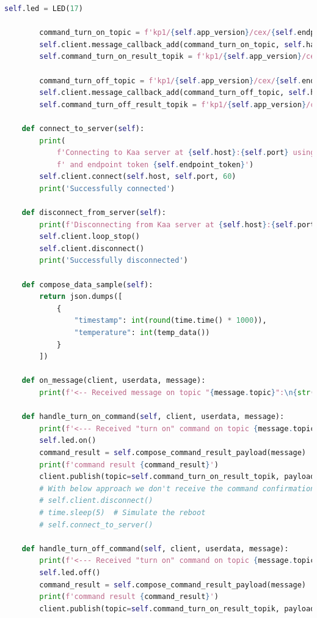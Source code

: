 {\begin{lstlisting}[language=Python]
        self.led = LED(17)

        command_turn_on_topic = f'kp1/{self.app_version}/cex/{self.endpoint_token}/command/turnon/status'
        self.client.message_callback_add(command_turn_on_topic, self.handle_turn_on_command)
        self.command_turn_on_result_topik = f'kp1/{self.app_version}/cex/{self.endpoint_token}/result/turnon'

        command_turn_off_topic = f'kp1/{self.app_version}/cex/{self.endpoint_token}/command/turnoff/status'
        self.client.message_callback_add(command_turn_off_topic, self.handle_turn_off_command)
        self.command_turn_off_result_topik = f'kp1/{self.app_version}/cex/{self.endpoint_token}/result/turnoff'

    def connect_to_server(self):
        print(
            f'Connecting to Kaa server at {self.host}:{self.port} using application version {self.app_version}'
            f' and endpoint token {self.endpoint_token}')
        self.client.connect(self.host, self.port, 60)
        print('Successfully connected')

    def disconnect_from_server(self):
        print(f'Disconnecting from Kaa server at {self.host}:{self.port}...')
        self.client.loop_stop()
        self.client.disconnect()
        print('Successfully disconnected')

    def compose_data_sample(self):
        return json.dumps([
            {
                "timestamp": int(round(time.time() * 1000)),
                "temperature": int(temp_data())
            }
        ])

    def on_message(client, userdata, message):
        print(f'<-- Received message on topic "{message.topic}":\n{str(message.payload.decode("utf-8"))}')

    def handle_turn_on_command(self, client, userdata, message):
        print(f'<--- Received "turn on" command on topic {message.topic} \nTurning on...')
        self.led.on()
        command_result = self.compose_command_result_payload(message)
        print(f'command result {command_result}')
        client.publish(topic=self.command_turn_on_result_topik, payload=command_result)
        # With below approach we don't receive the command confirmation on the server side.
        # self.client.disconnect()
        # time.sleep(5)  # Simulate the reboot
        # self.connect_to_server()

    def handle_turn_off_command(self, client, userdata, message):
        print(f'<--- Received "turn on" command on topic {message.topic} \nTurning off...')
        self.led.off()
        command_result = self.compose_command_result_payload(message)
        print(f'command result {command_result}')
        client.publish(topic=self.command_turn_on_result_topik, payload=command_result)


\end{lstlisting}}
